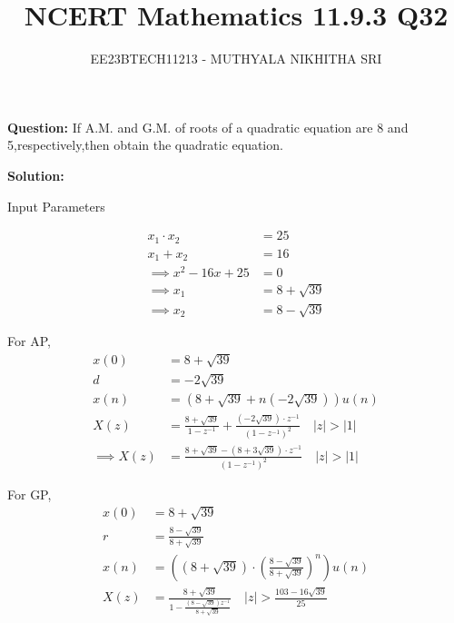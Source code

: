 \documentclass[journal,12pt,twocolumn]{IEEEtran}
\title{
	
\title{NCERT Mathematics 11.9.3 Q32}
\author{EE23BTECH11213 - MUTHYALA NIKHITHA SRI
}


}
\providecommand{\brak}[1]{\ensuremath{\left(#1\right)}}
\theoremstyle{remark}
\providecommand{\abs}[1]{\left\vert#1\right\vert}
\begin{document}
\maketitle

\textbf{Question:} 
If A.M. and G.M. of roots of a quadratic equation are 8 and 5,respectively,then obtain the quadratic equation.

\textbf{Solution: }
\fi

\begin{table}[h]
 	\centering
 	\resizebox{6 cm}{!}{
 		
 	}
 	\caption{Input Parameters}
    \label{tab:table_9.3.32}
 \end{table}


\begin{align}
x_1 \cdot x_2 &= 25 \\
x_1 + x_2 &= 16 \\
\implies  x^2 - 16x + 25 &= 0 \\
\implies x_1 &= 8+\sqrt{39} \\
\implies x_2 &= 8-\sqrt{39} 
\end{align}

For AP, 
\begin{align}
x\brak{0} &= 8+\sqrt{39} \\
d &= -2\sqrt{39} \\
x\brak{n} &= \brak{8+\sqrt{39} + n\brak{-2\sqrt{39}}}u\brak{n} \\
X\brak{z} &= \frac{8+\sqrt{39}}{1 - z^{-1}} + \frac{\brak{-2\sqrt{39}}\cdot z^{-1}}{\brak{1 - z^{-1}}^2}  \quad \abs{z} > \abs{1} \\
\implies X\brak{z} &= \frac{8+\sqrt{39}-\brak{8+3\sqrt{39}}\cdot{z^{-1}}}{\brak{1 - z^{-1}}^2} \quad \abs{z} > \abs{1}
\end{align}

For GP,
\begin{align}
x\brak{0} &= 8+\sqrt{39} \\
r &= \frac{8-\sqrt{39}}{8+\sqrt{39}} \\
x\brak{n} &= \brak{\brak{8+\sqrt{39}}\cdot {\brak{\frac{8-\sqrt{39}}{8+\sqrt{39}}}}^{n}}u\brak{n} \\
X\brak{z} &= \frac{8+\sqrt{39}}{1-\frac{\brak{8-\sqrt{39}}z^{-1}}{8+\sqrt{39}}} \quad \abs{z} > \frac{103-16\sqrt{39}}{25}
\end{align}
\end{document}
